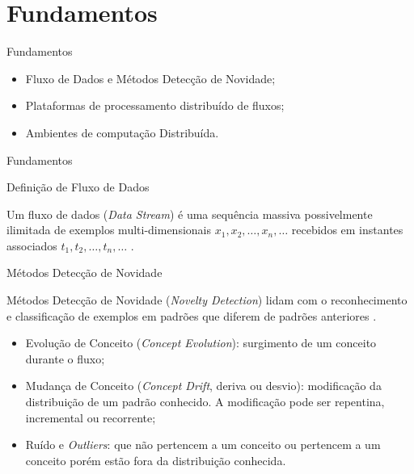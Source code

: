 \documentclass[aspectratio=1610,10pt]{beamer}
\begin{document}
\section{Fundamentos}
\begin{frame}[fragile]{Fundamentos}
\begin{itemize}
  \item Fluxo de Dados e Métodos Detecção de Novidade;
  \item Plataformas de processamento distribuído de fluxos;
  \item Ambientes de computação Distribuída.
\end{itemize}
\end{frame}

\begin{frame}[fragile]{Fundamentos}
  \begin{block}{Definição de Fluxo de Dados}
    
    \vspace{1mm}

    Um fluxo de dados (\textit{Data Stream}) é uma sequência massiva possivelmente
    ilimitada de exemplos multi-dimensionais $x_1, x_2, \dots, x_n, \dots$
    recebidos em instantes associados $t_1, t_2, \dots, t_n, \dots$
    \cite{Aggarwal2003}.
  \end{block}

  \begin{alertblock}{Métodos Detecção de Novidade}
    
    \vspace{1mm}
    Métodos Detecção de Novidade (\emph{Novelty Detection}) lidam com o reconhecimento e
    classificação de exemplos em padrões que diferem de padrões anteriores
    \cite{Gama2010}.
    \begin{itemize}%
      
      \item Evolução de Conceito (\emph{Concept Evolution}): surgimento de um conceito durante
      o fluxo;
      
      \item Mudança de Conceito (\emph{Concept Drift}, deriva ou desvio): modificação da
      distribuição de um padrão conhecido. A modificação pode ser repentina,
      incremental ou recorrente;
      
      \item Ruído e \emph{Outliers}: que não pertencem a um conceito ou
      pertencem a um conceito porém estão fora da distribuição conhecida.
      
    \end{itemize}
  \end{alertblock}
\end{frame}
\end{document}
